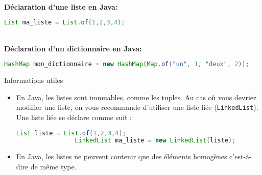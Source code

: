     \textbf{\\ Déclaration d'une liste en Java:}
    
    \begin{lstlisting}[language=Java]
              List ma_liste = List.of(1,2,3,4); \end{lstlisting}
            
    \textbf{\\ Déclaration d'un dictionnaire en Java:} 
    
    \begin{lstlisting}[language=Java]
              HashMap mon_dictionnaire = new HashMap(Map.of("un", 1, "deux", 2)); \end{lstlisting}
              
    
    \begin{Example}{\faTerminal \quad Informations utiles}
        \begin{itemize}
            \item En Java, les listes sont immuables, comme les tuples. Au cas où vous devriez modifier une liste, on vous recommande d'utiliser une liste liée (\lstinline{LinkedList}). Une liste liée se déclare comme suit :
    
            \begin{lstlisting}[language=Java]
                List liste = List.of(1,2,3,4);
                LinkedList ma_liste = new LinkedList(liste); \end{lstlisting}
            \item En Java, les listes ne peuvent contenir que des éléments homogènes c'est-à-dire de même type.
        \end{itemize} 
        
    \end{Example}
	     

